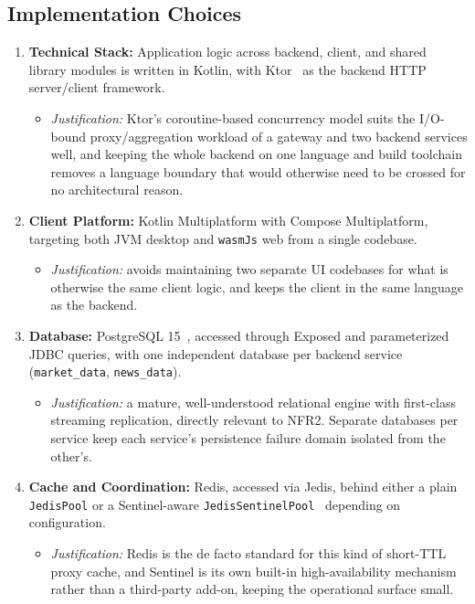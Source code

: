 \documentclass{scrartcl}
\begin{document}
\subsection{Implementation Choices}\label{implementation-choices}

\begin{enumerate}
  \item \textbf{Technical Stack:} Application logic across backend, client, and shared library
  modules is written in Kotlin, with Ktor~\citep{ktor2024docs} as the backend HTTP
  server/client framework.
  \begin{itemize}
    \item \emph{Justification:} Ktor's coroutine-based concurrency model suits the I/O-bound
    proxy/aggregation workload of a gateway and two backend services well, and keeping the whole
    backend on one language and build toolchain removes a language boundary that would otherwise
    need to be crossed for no architectural reason.
  \end{itemize}

  \item \textbf{Client Platform:} Kotlin Multiplatform with Compose Multiplatform, targeting both
  JVM desktop and \texttt{wasmJs} web from a single codebase.
  \begin{itemize}
    \item \emph{Justification:} avoids maintaining two separate UI codebases for what is
    otherwise the same client logic, and keeps the client in the same language as the backend.
  \end{itemize}

  \item \textbf{Database:} PostgreSQL 15~\citep{postgresql2024docs}, accessed through Exposed
  and parameterized JDBC queries, with one independent database per backend service (\texttt{market\_data},
  \texttt{news\_data}).
  \begin{itemize}
    \item \emph{Justification:} a mature, well-understood relational engine with first-class
    streaming replication, directly relevant to NFR2. Separate databases per service keep each
    service's persistence failure domain isolated from the other's.
  \end{itemize}

  \item \textbf{Cache and Coordination:} Redis, accessed via Jedis, behind either a plain
  \texttt{JedisPool} or a Sentinel-aware \texttt{JedisSentinelPool}~\citep{redis2024sentinel}
  depending on configuration.
  \begin{itemize}
    \item \emph{Justification:} Redis is the de facto standard for this kind of short-TTL proxy
    cache, and Sentinel is its own built-in high-availability mechanism rather than a
    third-party add-on, keeping the operational surface small.
  \end{itemize}


\end{enumerate}
\end{document}
